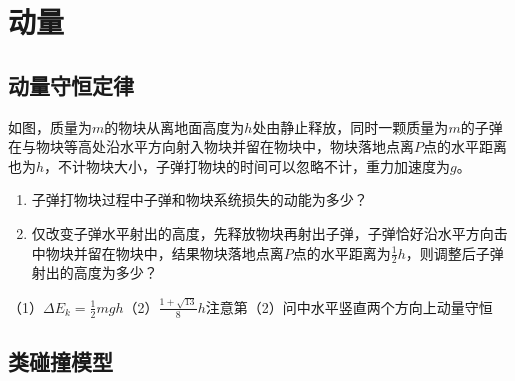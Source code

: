 \section{动量}

\subsection{动量守恒定律}

\begin{proset}
    如图，质量为\(m\)的物块从离地面高度为\(h\)处由静止释放，同时一颗质量为\(m\)的子弹在与物块等高处沿水平方向射入物块并留在物块中，物块落地点离\(P\)点的水平距离也为\(h\)，不计物块大小，子弹打物块的时间可以忽略不计，重力加速度为\(g\)。
    \begin{enumerate}[(1)]
        \item 子弹打物块过程中子弹和物块系统损失的动能为多少？
        \item 仅改变子弹水平射出的高度，先释放物块再射出子弹，子弹恰好沿水平方向击中物块并留在物块中，结果物块落地点离\(P\)点的水平距离为\(\frac{1}{2}h\)，则调整后子弹射出的高度为多少？
    \end{enumerate}
\end{proset}
\begin{answer}
    （1）\(\Delta E_k = \frac{1}{2}mgh\)（2）\(\frac{1 + \sqrt{13}}{8}h\)\qquad 注意第（2）问中水平竖直两个方向上动量守恒
\end{answer}

\subsection{类碰撞模型}

